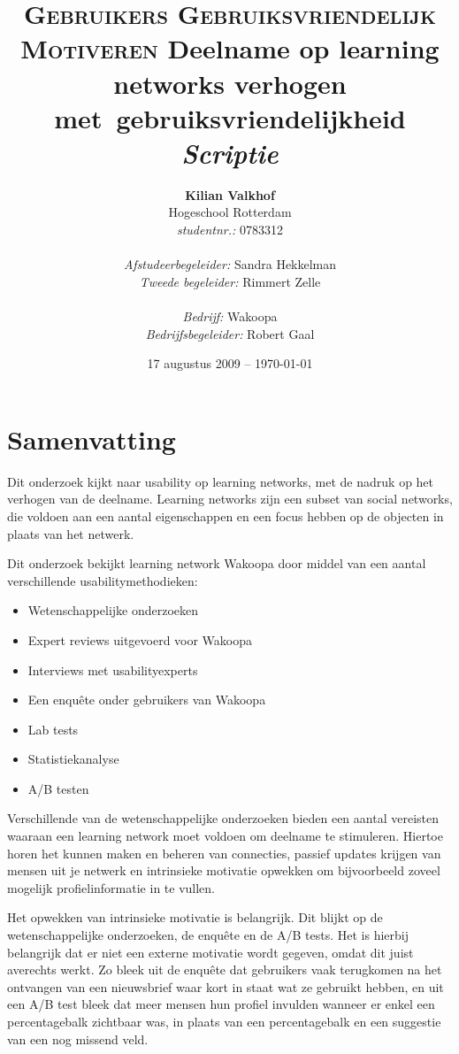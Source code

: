 \documentclass[a4paper, 10pt, pdftex]{report}
\title{\textsc{Gebruikers Gebruiksvriendelijk Motiveren}
  \linebreak Deelname op learning networks verhogen met~gebruiksvriendelijkheid \linebreak \linebreak \emph{Scriptie}}
\author{\textbf{Kilian Valkhof}\\
  Hogeschool Rotterdam\\
  \textit{studentnr.:} 0783312\\
  \\
  \textit{Afstudeerbegeleider:} Sandra Hekkelman\\
  \textit{Tweede begeleider:} Rimmert Zelle\\
  \\
  \textit{Bedrijf:} Wakoopa\\
  \textit{Bedrijfsbegeleider:} Robert Gaal}
\date{17 augustus 2009 -- \today}
\begin{document}
  \normalem
  \maketitle

  \newpage
  \chapter*{Samenvatting}
    Dit onderzoek kijkt naar usability op learning networks, met de nadruk op het verhogen van de deelname. Learning networks zijn een subset van social networks, die voldoen aan een aantal eigenschappen en een focus hebben op de objecten in plaats van het netwerk.

    Dit onderzoek bekijkt learning network Wakoopa door middel van een aantal verschillende usabilitymethodieken:
    \begin{itemize}
      \item Wetenschappelijke onderzoeken
      \item Expert reviews uitgevoerd voor Wakoopa
      \item Interviews met usabilityexperts
      \item Een enqu\^ete onder gebruikers van Wakoopa
      \item Lab tests
      \item Statistiekanalyse
      \item A/B testen
    \end{itemize}

    Verschillende van de wetenschappelijke onderzoeken bieden een aantal vereisten waaraan een learning network moet voldoen om deelname te stimuleren. Hiertoe horen het kunnen maken en beheren van connecties, passief updates krijgen van mensen uit je netwerk en intrinsieke motivatie opwekken om bijvoorbeeld zoveel mogelijk profielinformatie in te vullen.

    Het opwekken van intrinsieke motivatie is belangrijk. Dit blijkt op de wetenschappelijke onderzoeken, de enqu\^ete en de A/B tests. Het is hierbij belangrijk dat er niet een externe motivatie wordt gegeven, omdat dit juist averechts werkt. Zo bleek uit de enqu\^ete dat gebruikers vaak terugkomen na het ontvangen van een nieuwsbrief waar kort in staat wat ze gebruikt hebben, en uit een A/B test bleek dat meer mensen hun profiel invulden wanneer er enkel een percentagebalk zichtbaar was, in plaats van een percentagebalk en een suggestie van een nog missend veld.
\end{document}
